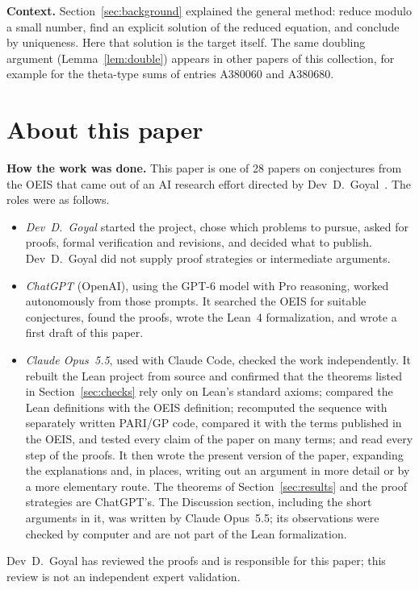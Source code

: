 \documentclass[11pt,a4paper]{article}
\theoremstyle{definition}
\theoremstyle{remark}
\newcommand{\para}[1]{\par\medskip\noindent\textbf{#1}\enspace}
\begin{document}
\para{Context.} Section~\ref{sec:background} explained the general method: reduce modulo a small number, find an explicit
solution of the reduced equation, and conclude by uniqueness. Here that solution is the target itself. The same
doubling argument (Lemma~\ref{lem:double}) appears in other papers of this collection, for example for the theta-type
sums of entries A380060 and A380680.

\section*{About this paper}\label{sec:about}
\para{How the work was done.}
This paper is one of 28 papers on conjectures from the OEIS that came out of an AI research effort directed by
Dev~D.~Goyal~\cite{repo}. The roles were as follows.
\begin{itemize}
\item \emph{Dev~D.~Goyal} started the project, chose which problems to pursue, asked for proofs, formal verification and
revisions, and decided what to publish. Dev~D.~Goyal did not supply proof strategies or intermediate arguments.
\item \emph{ChatGPT} (OpenAI), using the GPT-6 model with Pro reasoning, worked autonomously from those prompts. It
searched the OEIS for suitable conjectures, found the proofs, wrote the Lean~4 formalization, and wrote a first draft
of this paper.
\item \emph{Claude Opus~5.5}, used with Claude Code, checked the work independently. It rebuilt the Lean project from source and confirmed that the theorems listed in Section~\ref{sec:checks} rely only on
Lean's standard axioms; compared the Lean definitions with the OEIS definition; recomputed the sequence with separately
written PARI/GP code, compared it with the terms published in the OEIS, and tested every claim of the paper on many
terms; and read every step of the proofs. It then wrote the present version of the paper, expanding the
explanations and, in places, writing out an argument in more detail or by a more elementary route. The theorems of
Section~\ref{sec:results} and the proof strategies are ChatGPT's. The Discussion section, including the short arguments
in it, was written by Claude Opus~5.5; its observations were checked by computer and are not part of the Lean
formalization.
\end{itemize}
Dev~D.~Goyal has reviewed the proofs and is responsible for this paper; this review is not an independent expert
validation.
\end{document}

